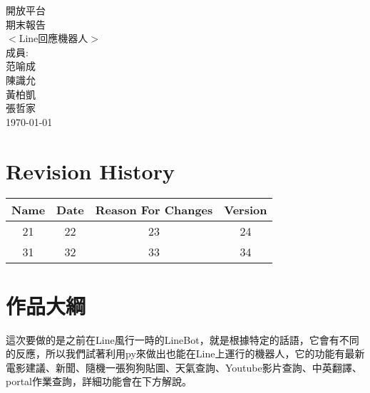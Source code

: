 \documentclass{scrreprt}
\date{}
\begin{document}
\begin{CJK}{UTF8}{bkai}
\begin{center}
    \begin{bfseries}
        \Huge{開放平台\\期末報告}\\
        \vspace{3.8cm}
        $<$Line回應機器人$>$\\
        \vspace{1.9cm}
        \LARGE{成員:}\\
        \vspace{1.0cm}
        范喻成\\
        \vspace{0.5cm}
        陳識允\\
        \vspace{0.5cm}
        黃柏凱\\
        \vspace{0.5cm}
        張哲家\\
        \vspace{0.5cm}
        \today\\
    \end{bfseries}
\end{center}

\tableofcontents

\chapter*{Revision History}

\begin{center}
    \begin{tabular}{|c|c|c|c|}
        \hline
	    Name & Date & Reason For Changes & Version\\
        \hline
	    21 & 22 & 23 & 24\\
        \hline
	    31 & 32 & 33 & 34\\
        \hline
    \end{tabular}
\end{center}

\chapter{作品大綱}

這次要做的是之前在Line風行一時的LineBot，就是根據特定的話語，它會有不同的反應，所以我們試著利用py來做出也能在Line上運行的機器人，它的功能有{\color{red}最新電影建議}、{\color{red}新聞}、{\color{red}隨機一張狗狗貼圖}、{\color{red}天氣查詢}、{\color{red}Youtube影片查詢}、{\color{red}中英翻譯}、{\color{red}portal作業查詢}，詳細功能會在下方解說。


\end{CJK}
\end{document}

